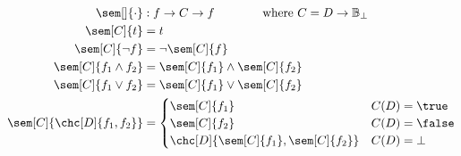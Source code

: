 \begin{align*}
  \sem[]{\cdot} &: f\rightarrow C \rightarrow f
    \qquad\qquad \text{where } C = D\rightarrow\mathbb{B}_\bot \\
  \sem[C]{t}             &= t \\
  \sem[C]{\neg f}        &= \neg \sem[C]{f} \\
  \sem[C]{f_1\wedge f_2} &= \sem[C]{f_1}\wedge\sem[C]{f_2}\\
  \sem[C]{f_1\vee f_2}   &= \sem[C]{f_1}\vee\sem[C]{f_2}\\
  \sem[C]{\chc[D]{f_1,f_2}} &=
    \begin{cases}
      \sem[C]{f_1}                       & C(D) = \true \\
      \sem[C]{f_2}                       & C(D) = \false \\
      \chc[D]{\sem[C]{f_1},\sem[C]{f_2}} & C(D) = \bot \\
    \end{cases}
\end{align*}
